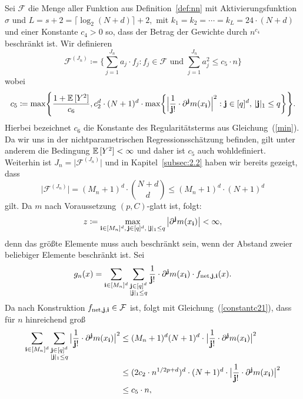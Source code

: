 Sei $\mathcal{F}$ die Menge aller Funktion aus Definition~\ref{def:nn} mit Aktivierungsfunktion $\sigma$ und $L = s + 2 = \lceil\log_2(N + d)\rceil + 2,$ mit $k_1 = k_2 = \cdots = k_L = 24 \cdot (N + d)$ und einer Konstante $c_4 > 0$ so, dass der Betrag der Gewichte durch $n^{c_{4}}$ beschränkt ist. Wir definieren
$$ \mathcal{F}^{(J_n)} \coloneqq \biggl\{\sum_{j = 1}^{J_n} a_j \cdot f_j : f_j \in \mathcal{F} \text{ und } \sum_{j = 1}^{J_n} a_j^2 \leq c_5 \cdot n \biggr\}$$
wobei
\begin{equation}
\label{constantc21}
\begin{split}
c_5 \coloneqq \max\Biggl\{\frac{1 + \mathbb{E}\,[Y^2]}{c_6}, c_2^d \cdot (N + 1)^d \cdot \max\biggl\{\Big| \frac{1}{\mathbf{j}!} \cdot \partial^{\mathbf{j}}m(x_{\mathbf{i}})\Big|^2 : \mathbf{j} \in [q]^d,\, |\mathbf{j}|_1 \leq q\biggr\}\Biggr\}.
\end{split}
\end{equation}
Hierbei bezeichnet $c_6$ die Konstante des Regularitätsterms aus Gleichung~(\ref{min}). Da wir uns in der nichtparametrischen Regressionsschätzung befinden, gilt unter anderem die Bedingung $\mathbb{E}\,[Y^2] < \infty$ und daher ist $c_5$ auch wohldefiniert.
Weiterhin ist
$J_n = \Big|\mathcal{F}^{(J_n)}\Big|$ 
und in Kapitel~\ref{subsec:2.2} haben wir bereits gezeigt, dass 
$$\Big|\mathcal{F}^{(J_n)}\Big| =  (M_n + 1)^d \cdot \binom{N + d}{d} \leq (M_n + 1)^d \cdot (N + 1)^d$$
gilt.
Da $m$ nach Voraussetzung $(p,C)$-glatt ist, folgt:
\begin{equation}
\label{bound}
z \coloneqq \max_{\mathbf{i} \in [M_n]^d,\, \mathbf{j} \in [q]^d,\, |\mathbf{j}|_1 \leq q} \big|\partial^{\mathbf{j}}m(x_{\mathbf{i}})\big| < \infty,
\end{equation}
denn das größte Elemente muss auch beschränkt sein, wenn der Abstand zweier beliebiger Elemente beschränkt ist.
Sei 
$$g_n(x) = \sum_{\mathbf{i} \in [M_n]^d} \sum_{\substack{ \mathbf{j} \in [q]^d \\ |\mathbf{j}|_1 \leq q}} \frac{1}{\mathbf{j}!} \cdot \partial^{\mathbf{j}}m(x_{\mathbf{i}}) \cdot f_{\mathrm{net},\mathbf{j},\mathbf{i}}(x).$$
Da nach Konstruktion $f_{\mathrm{net},\mathbf{j},\mathbf{i}} \in \mathcal{F}$ ist, folgt mit Gleichung~(\ref{constantc21}), dass für $n$ hinreichend groß
\begin{equation*}
\begin{split}
\sum_{\mathbf{i} \in [M_n]^d} \sum_{\substack{ \mathbf{j} \in [q]^d \\ |\mathbf{j}|_1 \leq q}} \big| \frac{1}{\mathbf{j}!} \cdot \partial^{\mathbf{j}}m(x_{\mathbf{i}})\big|^2 & \leq (M_n + 1)^d (N + 1)^d \cdot \big|\frac{1}{\mathbf{j}!} \cdot \partial^{\mathbf{j}}m(x_{\mathbf{i}})\big|^2 \\
& \leq (2 c_2 \cdot n^{1/2p + d})^d \cdot (N + 1)^d \cdot \big|\frac{1}{\mathbf{j}!} \cdot \partial^{\mathbf{j}}m(x_{\mathbf{i}})\big|^2 \\
& \leq c_5 \cdot n,
\end{split}
\end{equation*}
